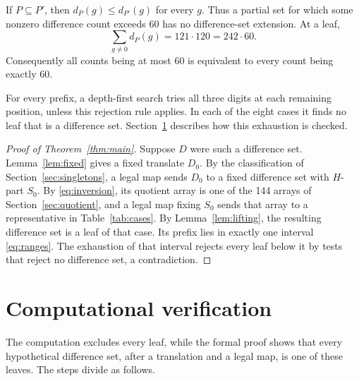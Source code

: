 \documentclass[11pt]{article}
\begin{document}
If $P\subseteq P'$, then $d_P(g)\leq d_{P'}(g)$
for every $g$. Thus a partial set for which some
nonzero difference count exceeds 60 has no
difference-set extension. At a leaf,
\[
 \sum_{g\ne0}d_P(g)=121\cdot120=242\cdot60.
\]
Consequently all counts being at most 60 is equivalent
to every count being exactly 60.

For every prefix, a depth-first search tries all three digits at each
remaining position, unless this rejection rule applies. In each of the
eight cases it finds no leaf that is a difference set.
Section~\ref{sec:formal} describes how this exhaustion is checked.

\begin{proof}[Proof of Theorem~\ref{thm:main}]
Suppose $D$ were such a difference set.
Lemma~\ref{lem:fixed} gives a fixed translate $D_0$.
By the classification of Section~\ref{sec:singletons}, a legal map
sends $D_0$ to a fixed difference set with $H$-part $S_0$.
By \eqref{eq:inversion}, its quotient array is one of the 144 arrays of
Section~\ref{sec:quotient}, and a legal map fixing $S_0$ sends that
array to a representative in Table~\ref{tab:cases}. By
Lemma~\ref{lem:lifting}, the resulting difference set is a leaf of that
case. Its prefix lies in exactly one interval \eqref{eq:ranges}. The
exhaustion of that interval rejects every leaf below it by tests that
reject no difference set, a contradiction.
\end{proof}

\section{Computational verification}\label{sec:formal}

The computation excludes every leaf, while the formal proof shows that
every hypothetical difference set, after a translation and a legal map,
is one of these leaves. The steps divide as follows.
\end{document}
